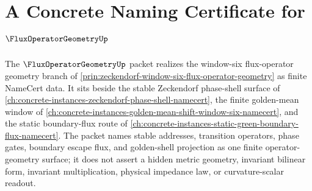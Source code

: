 \chapter{A Concrete Naming Certificate for $\FluxOperatorGeometryUp$}
\label{ch:concrete-instances-flux-operator-geometry-namecert}

The $\FluxOperatorGeometryUp$ packet realizes the window-six flux-operator geometry branch of \autoref{prin:zeckendorf-window-six-flux-operator-geometry} as finite NameCert data. It sits beside the stable Zeckendorf phase-shell surface of \autoref{ch:concrete-instances-zeckendorf-phase-shell-namecert}, the finite golden-mean window of \autoref{ch:concrete-instances-golden-mean-shift-window-six-namecert}, and the static boundary-flux route of \autoref{ch:concrete-instances-static-green-boundary-flux-namecert}. The packet names stable addresses, transition operators, phase gates, boundary escape flux, and golden-shell projection as one finite operator-geometry surface; it does not assert a hidden metric geometry, invariant bilinear form, invariant multiplication, physical impedance law, or curvature-scalar readout.

